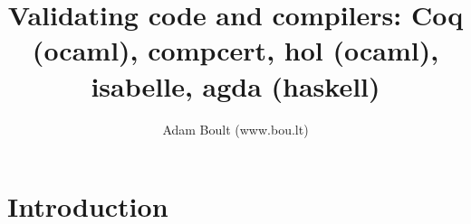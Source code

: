 \documentclass[oneside]{book}
\begin{document}
\author{Adam Boult (www.bou.lt)}
\title{Validating code and compilers: Coq (ocaml), compcert, hol (ocaml), isabelle, agda (haskell)}
\maketitle

\setcounter{tocdepth}{0}
\tableofcontents



\part{Introduction}
\end{document}
